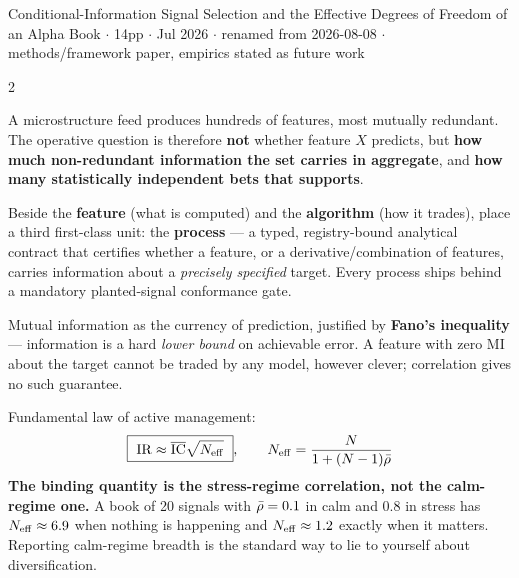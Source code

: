\documentclass[10pt,a4paper]{article}
\begin{document}
\small

{Conditional-Information Signal Selection and the Effective Degrees of Freedom of an Alpha Book}
{ $\cdot$ 14pp $\cdot$ Jul 2026 $\cdot$ renamed from 
 2026-08-08 $\cdot$ methods/framework paper, empirics stated as future work}

\begin{multicols}{2}

A microstructure feed produces hundreds of features, most mutually redundant. The operative question is
therefore \textbf{not} whether feature $X$ predicts, but \textbf{how much non-redundant information the
set carries in aggregate}, and \textbf{how many statistically independent bets that supports}.

Beside the \textbf{feature} (what is computed) and the \textbf{algorithm} (how it trades), place a third
first-class unit: the \textbf{process} — a typed, registry-bound analytical contract that certifies
whether a feature, or a derivative/combination of features, carries information about a
\emph{precisely specified} target. Every process ships behind a mandatory planted-signal conformance gate.

Mutual information as the currency of prediction, justified by \textbf{Fano's inequality} — information is
a hard \emph{lower bound} on achievable error. A feature with zero MI about the target cannot be traded by
any model, however clever; correlation gives no such guarantee.

Fundamental law of active management:
\[
  \boxed{\ \operatorname{IR} \approx \overline{\mathrm{IC}}\sqrt{N_{\mathrm{eff}}}\ },\qquad
  N_{\mathrm{eff}}=\frac{N}{1+(N-1)\bar{\rho}}
\]
\textbf{The binding quantity is the stress-regime correlation, not the calm-regime one.} A book of 20
signals with $\bar{\rho}=0.1$ in calm and $0.8$ in stress has $N_{\mathrm{eff}}\approx6.9$ when nothing is happening and
$N_{\mathrm{eff}}\approx1.2$ exactly when it matters. Reporting calm-regime breadth is the standard way to lie to
yourself about diversification.


\end{multicols}
\end{document}
